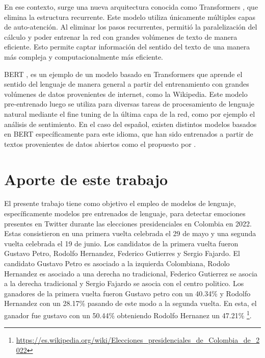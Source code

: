En ese contexto, surge una nueva arquitectura conocida como Transformers \citep{vaswani2017attention}, que elimina la estructura recurrente. Este modelo utiliza únicamente múltiples capas de auto-atención. Al eliminar los pasos recurrentes, permitió la paralelización del cálculo y poder entrenar la red con grandes volúmenes de texto de manera eficiente. Esto permite captar información del sentido del texto de una manera más compleja y computacionalmente más eficiente.

BERT \citep{devlin2018bert}, es un ejemplo de un modelo basado en Transformers que aprende el sentido del lenguaje de manera general a partir del entrenamiento con grandes volúmenes de datos provenientes de internet, como la Wikipedia. Este modelo pre-entrenado luego se utiliza para diversas tareas de procesamiento de lenguaje natural mediante el fine tuning de la última capa de la red, como por ejemplo el análisis de sentimiento. En el caso del español, existen distintos modelos basados en BERT específicamente para este idioma, que han sido entrenados a partir de textos provenientes de datos abiertos como el propuesto por \cite{canete2020spanish}. 





\section{Aporte de este trabajo}

El presente trabajo tiene como objetivo el empleo de modelos de lenguaje, específicamente modelos pre entrenados de lenguaje, para detectar emociones presentes en Twitter durante las elecciones presidenciales en Colombia en 2022. Estas consistieron en una primera vuelta celebrada el 29 de mayo y una segunda vuelta celebrada el 19 de junio. Los candidatos de la primera vuelta fueron Gustavo Petro, Rodolfo Hernandez, Federico Gutierres y Sergio Fajardo. El candidato Gustavo Petro es asociado a la izquierda Colombiana, Rodolo Hernandez es asociado a una derecha no tradicional, Federico Gutierrez se asocia a la derecha tradicional y Sergio Fajardo se asocia con el centro politico. Los ganadores de la primera vuelta fueron Gustavo petro con un 40.34\% y Rodolfo Hernandez con un 28.17\% pasando de este modo a la segunda vuelta. En esta, el ganador fue gustavo con un 50.44\% obteniendo Rodolfo Hernanez un 47.21\% \footnote{\url{https://es.wikipedia.org/wiki/Elecciones_presidenciales_de_Colombia_de_2022}}.

